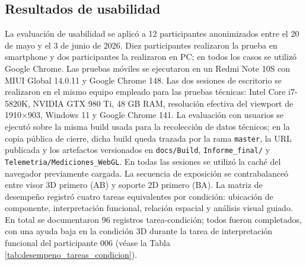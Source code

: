 \subsection{Resultados de usabilidad}

La evaluación de usabilidad se aplicó a 12 participantes anonimizados entre el 20 de mayo y el 3 de junio de 2026. Diez participantes realizaron la prueba en smartphone y dos participantes la realizaron en PC; en todos los casos se utilizó Google Chrome. Las pruebas móviles se ejecutaron en un Redmi Note 10S con MIUI Global 14.0.11 y Google Chrome 148. Las dos sesiones de escritorio se realizaron en el mismo equipo empleado para las pruebas técnicas: Intel Core i7-5820K, NVIDIA GTX 980 Ti, 48 GB RAM, resolución efectiva del viewport de 1910\(\times\)903, Windows 11 y Google Chrome 141. La evaluación con usuarios se ejecutó sobre la misma build usada para la recolección de datos técnicos; en la copia pública de cierre, dicha build queda trazada por la rama \texttt{master}, la URL publicada y los artefactos versionados en \texttt{docs/Build}, \texttt{Informe\_final/} y \texttt{Telemetria/Mediciones\_WebGL}. En todas las sesiones se utilizó la caché del navegador previamente cargada. La secuencia de exposición se contrabalanceó entre visor 3D primero (AB) y soporte 2D primero (BA). La matriz de desempeño registró cuatro tareas equivalentes por condición: ubicación de componente, interpretación funcional, relación espacial y análisis visual guiado. En total se documentaron 96 registros tarea-condición; todos fueron completados, con una ayuda baja en la condición 3D durante la tarea de interpretación funcional del participante 006 (véase la Tabla \ref{tab:desempeno_tareas_condicion}).

